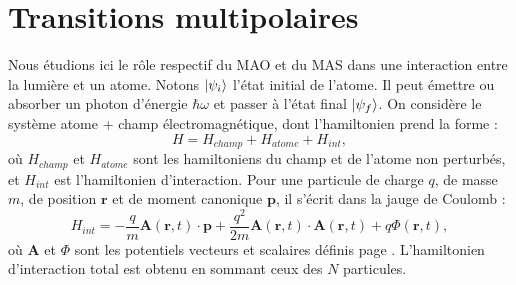 \section{Transitions multipolaires}
\label{sec:multipolar}
Nous étudions ici le rôle respectif du MAO et du MAS dans une interaction entre la lumière et un atome. Notons $\ket{\psi_i}$ l'état initial de l'atome. Il peut émettre ou absorber un photon d'énergie $\hbar\omega$ et passer à l'état final $\ket{\psi_f}$. On considère le système {atome + champ électromagnétique}, dont l'hamiltonien prend la forme :
\[ H = H_{champ} + H_{atome} + H_{int},\]
où $H_{champ}$ et $H_{atome}$ sont les hamiltoniens du champ et de l'atome non perturbés, et $H_{int}$ est l'hamiltonien d'interaction. Pour une particule de charge $q$, de masse $m$, de position $\bm{r}$ et de moment canonique $\bm{p}$, il s'écrit dans la jauge de Coulomb :
\begin{equation}
H_{int} = -\frac{q}{m}\bm{A}(\bm{r},t)\cdot\bm{p}+\frac{q^2}{2m}\bm{A}(\bm{r},t)\cdot\bm{A}(\bm{r},t)+q\Phi(\bm{r},t),
\label{eq:hint}
\end{equation}
où $\bm{A}$ et $\Phi$ sont les potentiels vecteurs et scalaires définis page \pageref{eq:para10}. L'hamiltonien d'interaction total est obtenu en sommant ceux des $N$ particules. 

